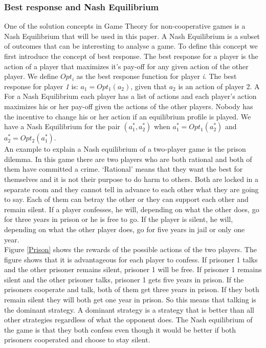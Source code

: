 \subsubsection{Best response and Nash Equilibrium}
One of the solution concepts in Game Theory for non-cooperative games is a Nash Equilibrium that will be used in this paper. A Nash Equilibrium is a subset of outcomes that can be interesting to analyse a game. To define this concept we first introduce the concept of best response. The best response for a player is the action of a player that maximizes it's pay-off for any given action of the other player. We define $Opt_{i}$ as the best response function for player \textit{i}. The best response for player \textit{1} is: $a_{1} = Opt_{1}(a_{2})$, given that $a_{2}$ is an action of player 2. A 
For a Nash Equilibrium each player has a list of actions and each player's action maximizes his or her pay-off given the actions of the other players. Nobody has the incentive to change his or her action if an equilibrium profile is played. We have a Nash Equilibrium for the pair $(a_{1}^{*},a_{2}^{*})$ when $a_{1}^{*} = Opt_{1}(a_{2}^{*})$ and $a_{2}^{*} = Opt_{2}(a_{1}^{*})$.\\


An example to explain a Nash equilibrium of a two-player game is the prison dilemma. In this game there are two players who are both rational and both of them have committed a crime. `Rational' means that they want the best for themselves and it is not their purpose to do harm to others. Both are locked in a separate room and they cannot tell in advance to each other what they are going to say. Each of them can betray the other or they can support each other and remain silent. If a player confesses, he will, depending on what the other does, go for three years in prison or he is free to go. If the player is silent, he will, depending on what the other player does, go for five years in jail or only one year. \\


Figure \ref{Prison} shows the rewards of the possible actions of the two players. The figure shows that it is advantageous for each player to confess. If prisoner 1 talks and the other prisoner remains silent, prisoner 1 will be free. If prisoner 1 remains silent and the other prisoner talks, prisoner 1 gets five years in prison. If the prisoners cooperate and talk, both of them get three years in prison. If they both remain silent they will both get one year in prison. So this means that talking is the dominant strategy. A dominant strategy is a strategy that is better than all other strategies regardless of what the opponent does. The Nash equilibrium of the game is that they both confess even though it would be better if both prisoners cooperated and choose to stay silent. 

